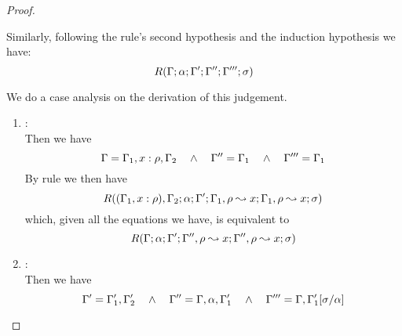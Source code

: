 \begin{proof}
\begin{description}
  Similarly, following the rule's second hypothesis and the induction hypothesis we have:
\begin{equation*}
  R(\Gamma;\alpha;\Gamma';\Gamma'';\Gamma''';\sigma)
\end{equation*}

  We do a case analysis on the derivation of this judgement.
  \begin{enumerate}
  \item {}: \\ Then we have
\begin{equation*}
  \Gamma = \Gamma_1,x:\rho,\Gamma_2  \quad\wedge\quad \Gamma'' = \Gamma_1 \quad\wedge\quad \Gamma''' = \Gamma_1
\end{equation*}
       By rule  we then have
\begin{equation*}
R((\Gamma_1,x:\rho),\Gamma_2;\alpha;\Gamma';\Gamma_1,\rho \leadsto x;\Gamma_1,\rho\leadsto x;\sigma)
\end{equation*}
        which, given all the equations we have, is equivalent to
\begin{equation*}
R(\Gamma;\alpha;\Gamma';\Gamma'',\rho\leadsto x;\Gamma'',\rho\leadsto x;\sigma)
\end{equation*}

  \item {}: \\
   Then we have
\begin{equation*}
  \Gamma' = \Gamma_1',\Gamma_2'  \quad\wedge\quad \Gamma'' = \Gamma,\alpha,\Gamma_1' \quad\wedge\quad 
      \Gamma''' = \Gamma,\Gamma_1'[\sigma/\alpha]
\end{equation*}


\end{enumerate}
\end{description}
\end{proof}
